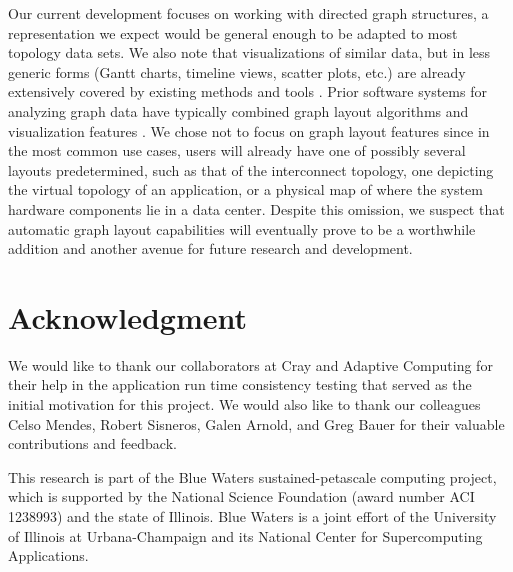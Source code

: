 \documentclass[
    10pt,
    conference,
    compsocconf
]{IEEEtran}
\begin{document}
    Our current development focuses on working with directed graph structures, a
    representation we expect would be general enough to be adapted to most
    topology data sets.  We also note that visualizations of similar data, but
    in less generic forms (Gantt charts, timeline views, scatter plots, etc.) are
    already extensively covered by existing methods and tools
    \cite{Herrarte:1991,Heath:1991,Heath:1994,Karrels:1994,Kranzlmuller:1996,
    Nagel:1996,Jerding:1997,Kranzlmuller:1998,Topol:1998,Shaffer:1999,
    Wu:2000,Shende:2006,Chan:2007,Moreta:2007,Cornelissen:2008}.  Prior software
    systems for analyzing graph data have typically combined graph layout
    algorithms and visualization features
    \cite{Ellson:2001,Bastian:2009,Moscovich:2009,Auber:2010,
    Pinaud:2012,Zaidi:2012}.  We chose not to focus on graph layout features
    since in the most common use cases, users will already have one of possibly
    several layouts predetermined, such as that of the interconnect topology,
    one depicting the virtual topology of an application, or a physical map of
    where the system hardware components lie in a data center.  Despite this
    omission, we suspect that automatic graph layout capabilities will
    eventually prove to be a worthwhile addition and another avenue for future
    research and development.


\section*{Acknowledgment}

    We would like to thank our collaborators at Cray and Adaptive Computing for
    their help in the application run time consistency testing that served as
    the initial motivation for this project.  We would also like to thank our
    colleagues Celso Mendes, Robert Sisneros, Galen Arnold, and Greg Bauer for
    their valuable contributions and feedback.

    This research is part of the Blue Waters sustained-petascale computing
    project, which is supported by the National Science Foundation (award number
    ACI 1238993) and the state of Illinois. Blue Waters is a joint effort of the
    University of Illinois at Urbana-Champaign and its National Center for
    Supercomputing Applications.





\end{document}
